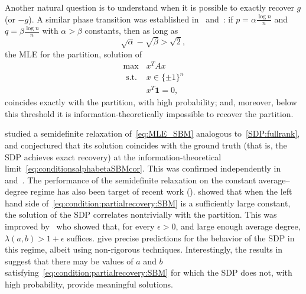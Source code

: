 \documentclass{colt2016} %
\newcommand{\1}{\mathbf{1}}
\begin{document}
Another natural question is to understand when it is possible to
exactly recover $g$ (or $-g$). A similar phase transition was
established in~\citep{abbe2014exact} and~\citep{Mossel_SBM3_exact}: if
$p = \alpha\frac{\log n}n$ and $q = \beta\frac{\log n}n$ with
$\alpha>\beta$ constants, then as long as
\begin{equation}\label{eq:conditionsalphabetaSBMcor}
 \sqrt{\alpha} - \sqrt{\beta} > \sqrt{2},
\end{equation}
the MLE for the partition, solution of
\begin{equation}\label{eq:MLE_SBM}
\begin{array}{ll}
 \max & x^TAx \\
 \text{ s.t. } & x \in \{ \pm 1 \}^n \\
 & x^T \1 = 0,
\end{array}
\end{equation}
coincides exactly with the partition, with high probability; and,
moreover, below this threshold it is information-theoretically
impossible to recover the partition.

\cite{abbe2014exact} studied a semidefinite relaxation
of~\eqref{eq:MLE_SBM} analogous to~\eqref{SDP:fullrank}, and
conjectured that its solution coincides with the ground truth (that is,
the SDP achieves exact recovery) at the information-theoretical
limit~\eqref{eq:conditionsalphabetaSBMcor}. This was confirmed
independently in~\citep{Hajek_et_al_SBM_SDP}
and~\citep{bandeira2015laplacian}. The performance of the semidefinite
relaxation on the constant average--degree regime has also been target
of recent work (\cite{Guedon_SBMgrothendieck,Montanari_SDPdetectionSBM,javanmard2015phase}).
\cite{Guedon_SBMgrothendieck} showed that when the left hand side
of~\eqref{eq:condition:partialrecovery:SBM} is a sufficiently large
constant, the solution of the SDP correlates nontrivially with the
partition. This was improved by~\cite{Montanari_SDPdetectionSBM} who
showed that, for every $\epsilon>0$, and large enough average degree,
$\lambda(a,b) > 1+\epsilon$ suffices. 
\cite{javanmard2015phase} give precise predictions for the
behavior of the SDP in this regime, albeit using non-rigorous
techniques. Interestingly, the results in~\citep{Moitra_SBMadversary}
suggest that there may be values of $a$ and $b$
satisfying~\eqref{eq:condition:partialrecovery:SBM} for which the SDP
does not, with high probability, provide meaningful solutions.
\end{document}
